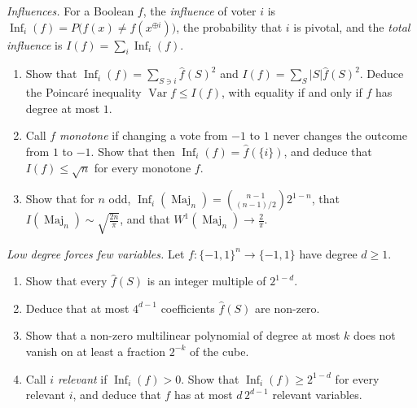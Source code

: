 \begin{exercise}[$\star\star$]\label{pb:influence}
\emph{Influences.} For a Boolean $f$, the \emph{influence} of voter $i$ is $\operatorname{Inf}_i(f)=P\bigl(f(x)\ne f(x^{\oplus i})\bigr)$, the probability that $i$ is
pivotal, and the \emph{total influence} is $I(f)=\sum_i\operatorname{Inf}_i(f)$.
\begin{enumerate}[label=(\alph*)]
\item Show that $\operatorname{Inf}_i(f)=\sum_{S\ni i}\hat f(S)^2$ and $I(f)=\sum_S|S|\hat f(S)^2$. Deduce the Poincaré inequality $\operatorname{Var}f\le I(f)$, with
equality if and only if $f$ has degree at most $1$.
\item Call $f$ \emph{monotone} if changing a vote from $-1$ to $1$ never changes the outcome from $1$ to $-1$. Show that then
$\operatorname{Inf}_i(f)=\hat f(\{i\})$, and deduce that $I(f)\le\sqrt n$ for every monotone $f$.
\item Show that for $n$ odd, $\operatorname{Inf}_i(\operatorname{Maj}_n)=\binom{n-1}{(n-1)/2}2^{1-n}$, that $I(\operatorname{Maj}_n)\sim\sqrt{\frac{2n}\pi}$, and that $W^1(\operatorname{Maj}_n)\to\frac2\pi$.
\end{enumerate}
\end{exercise}

\begin{exercise}[$\star\star\star$]\label{pb:granularity}
\emph{Low degree forces few variables.} Let $f:\{-1,1\}^n\to\{-1,1\}$ have degree $d\ge1$.
\begin{enumerate}[label=(\alph*)]
\item Show that every $\hat f(S)$ is an integer multiple of $2^{1-d}$.
\item Deduce that at most $4^{d-1}$ coefficients $\hat f(S)$ are non-zero.
\item Show that a non-zero multilinear polynomial of degree at most $k$ does not vanish on at least a fraction $2^{-k}$ of the
cube.
\item Call $i$ \emph{relevant} if $\operatorname{Inf}_i(f)>0$. Show that $\operatorname{Inf}_i(f)\ge2^{1-d}$ for every relevant $i$, and deduce that $f$ has at most
$d\,2^{d-1}$ relevant variables.
\end{enumerate}
\end{exercise}

